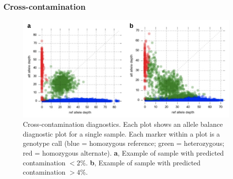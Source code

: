 \documentclass[a4paper,11pt,abstracton,hidelinks]{scrartcl}
\begin{document}
\subsubsection{Cross-contamination}


\begin{figure}[t!]
\centering
\includegraphics[width=\textwidth]{artwork/chapter3/contamination.pdf}
\caption{Cross-contamination diagnostics.
%
Each plot shows an allele balance diagnostic plot for a single sample.
%
Each marker within a plot is a genotype call (blue = homozygous reference; green = heterozygous; red = homozygous alternate).
%
\textbf{a}, Example of sample with predicted contamination $<2\%$.
%
\textbf{b}, Example of sample with predicted contamination $>4\%$.
}
%
\label{fig:contamination}
\end{figure}
\end{document}
